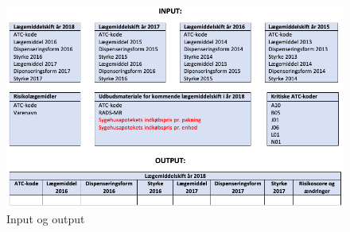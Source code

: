 \begin{figure}[H]\centering	\includegraphics[width=1\textwidth]{billeder/InputOutput.png} 
	\caption{Input og output}
	\label{fig:InputOutput}  
\end{figure}







